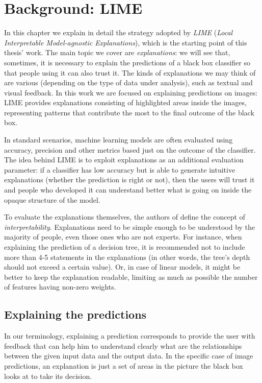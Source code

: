 \documentclass[12pt, twoside, a4paper]{report}
\begin{document}
\chapter{Background: LIME}\label{chapt:background}
In this chapter we explain in detail the strategy adopted by \textit{LIME} (\textit{Local Interpretable Model-agnostic Explanations})\cite{lime}, which is the starting point of this thesis' work. The main topic we cover are \textit{explanations}: we will see that, sometimes, it is necessary to explain the predictions of a black box classifier so that people using it can also trust it. The kinds of explanations we may think of are various (depending on the type of data under analysis), such as textual and visual feedback. In this work we are focused on explaining predictions on images: LIME provides explanations consisting of highlighted areas inside the images, representing patterns that contribute the most to the final outcome of the black box. 

In standard scenarios, machine learning models are often evaluated using accuracy, precision and other metrics based just on the outcome of the classifier. 
The idea behind LIME is to exploit explanations as an additional evaluation parameter: if a classifier has low accuracy but is able to generate intuitive explanations (whether the prediction is right or not), then the users will trust it and people who developed it can understand better what is going on inside the opaque structure of the model.

To evaluate the explanations themselves, the authors of \cite{lime} define the concept of \textit{interpretability}. Explanations need to be simple enough to be understood by the majority of people, even those ones who are not experts. For instance, when explaining the prediction of a decision tree, it is recommended not to include more than 4-5 statements in the explanations (in other words, the tree's depth should not exceed a certain value). 
Or, in case of linear models, it might be better to keep the explanation readable, limiting as much as possible the number of features having non-zero weights.

\section{Explaining the predictions}

In our terminology, explaining a prediction corresponds to provide the user with feedback that can help him to understand clearly what are the relationships between the given input data and the output data. In the specific case of image predictions, an explanation is just a set of areas in the picture the black box looks at to take its decision. 
\end{document}
